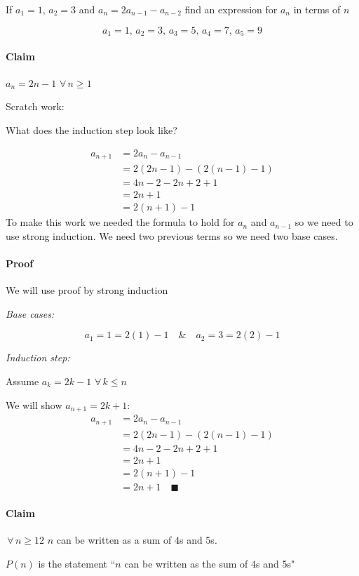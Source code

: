 \documentclass{article}
\newcommand{\A}{\,\forall\,}
\begin{document}
If \(a_1=1,\,a_2=3\) and \(a_n=2a_{n-1}-a_{n-2}\) find an expression for \(a_n\) in terms of \(n\)

\[a_1=1,\,a_2=3,\,a_3=5,\,a_4=7,\,a_5=9\]

\paragraph{Claim} \(a_n=2n-1\,\A n\ge 1\)

\begin{itshape}
Scratch work:

What does the induction step look like?

\begin{align*}
a_{n+1}&=2a_n-a_{n-1}\\
&=2(2n-1)-(2(n-1)-1)\\
&=4n-2-2n+2+1\\
&=2n+1\\
&=2(n+1)-1
\end{align*}
To make this work we needed the formula to hold for \(a_n\) and \(a_{n-1}\) so we need to use strong induction. We need two previous terms so we need two base cases.
\end{itshape}

\paragraph{Proof} We will use proof by strong induction

\emph{Base cases:}

\[a_1=1=2(1)-1\quad\&\quad a_2=3=2(2)-1\]

\emph{Induction step:}

Assume \(a_k=2k-1\,\A k\le n\)

We will show \(a_{n+1}=2k+1\):
\begin{align*}
a_{n+1}&=2a_n-a_{n-1}\\
&=2(2n-1)-(2(n-1)-1)\\
&=4n-2-2n+2+1\\
&=2n+1\\
&=2(n+1)-1\\
&=2n+1\quad\blacksquare
\end{align*}

\paragraph{Claim} \(\A n\ge 12\) \(n\) can be written as a sum of 4s and 5s.

\(P(n)\) is the statement ``\(n\) can be written as the sum of 4s and 5s"
\end{document}
